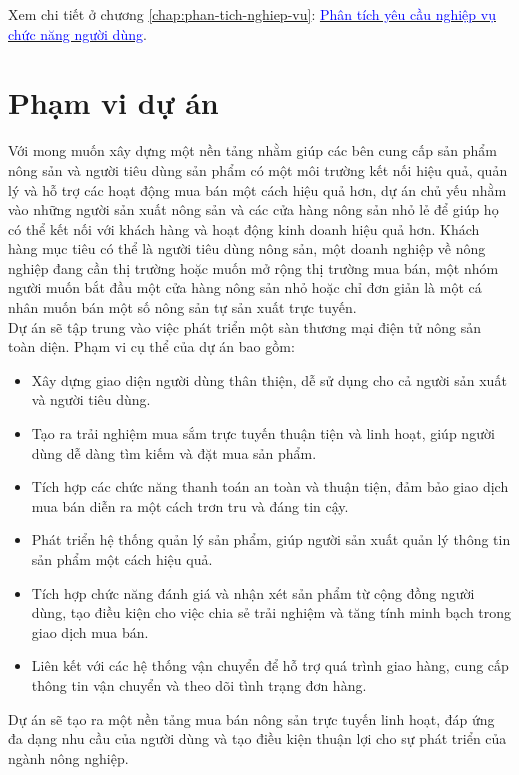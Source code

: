 Xem chi tiết ở chương \ref{chap:phan-tich-nghiep-vu}:
\hyperref[chap:phan-tich-nghiep-vu]{\textcolor{blue}{Phân tích yêu cầu nghiệp vụ chức năng người dùng}}.


\section{Phạm vi dự án}
\quad Với mong muốn xây dựng một nền tảng nhằm giúp các bên cung cấp sản phẩm nông sản và người tiêu dùng sản phẩm có một môi trường kết nối hiệu quả, quản lý và hỗ trợ các hoạt động mua bán một cách hiệu quả hơn, dự án chủ yếu nhằm vào những người sản xuất nông sản và các cửa hàng nông sản nhỏ lẻ để giúp họ có thể kết nối với khách hàng và hoạt động kinh doanh hiệu quả hơn. Khách hàng mục tiêu có thể là người tiêu dùng nông sản, một doanh nghiệp về nông nghiệp đang cần thị trường hoặc muốn mở rộng thị trường mua bán, một nhóm người muốn bắt đầu một cửa hàng nông sản nhỏ hoặc chỉ đơn giản là một cá nhân muốn bán một số nông sản tự sản xuất trực tuyến.\\

Dự án sẽ tập trung vào việc phát triển một sàn thương mại điện tử nông sản toàn diện. Phạm vi cụ thể của dự án bao gồm:
\begin{itemize}
    \item Xây dựng giao diện người dùng thân thiện, dễ sử dụng cho cả người sản xuất và người tiêu dùng.
    \item Tạo ra trải nghiệm mua sắm trực tuyến thuận tiện và linh hoạt, giúp người dùng dễ dàng tìm kiếm và đặt mua sản phẩm.
    \item Tích hợp các chức năng thanh toán an toàn và thuận tiện, đảm bảo giao dịch mua bán diễn ra một cách trơn tru và đáng tin cậy. 
    \item Phát triển hệ thống quản lý sản phẩm, giúp người sản xuất quản lý thông tin sản phẩm một cách hiệu quả.
    \item Tích hợp chức năng đánh giá và nhận xét sản phẩm từ cộng đồng người dùng, tạo điều kiện cho việc chia sẻ trải nghiệm và tăng tính minh bạch trong giao dịch mua bán.
    \item Liên kết với các hệ thống vận chuyển để hỗ trợ quá trình giao hàng, cung cấp thông tin vận chuyển và theo dõi tình trạng đơn hàng.
\end{itemize}

Dự án sẽ tạo ra một nền tảng mua bán nông sản trực tuyến linh hoạt, đáp ứng đa dạng nhu cầu của người dùng và tạo điều kiện thuận lợi cho sự phát triển của ngành nông nghiệp.


